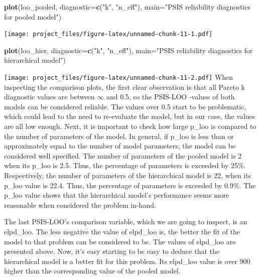 \documentclass[
]{article}
\newenvironment{Shaded}{\begin{snugshade}}{\end{snugshade}}
\newcommand{\DataTypeTok}[1]{\textcolor[rgb]{0.13,0.29,0.53}{#1}}
\newcommand{\KeywordTok}[1]{\textcolor[rgb]{0.13,0.29,0.53}{\textbf{#1}}}
\newcommand{\NormalTok}[1]{#1}
\newcommand{\StringTok}[1]{\textcolor[rgb]{0.31,0.60,0.02}{#1}}
\begin{document}
\begin{Shaded}
\begin{Highlighting}[]
\KeywordTok{plot}\NormalTok{(loo\_pooled,}
\DataTypeTok{diagnostic=}\KeywordTok{c}\NormalTok{(}\StringTok{"k"}\NormalTok{, }\StringTok{"n\_eff"}\NormalTok{),}
\DataTypeTok{main=}\StringTok{"PSIS reliability diagnostics for pooled model"}\NormalTok{)}
\end{Highlighting}
\end{Shaded}

\texttt{[image: project\_files/figure-latex/unnamed-chunk-11-1.pdf]}

\begin{Shaded}
\begin{Highlighting}[]
\KeywordTok{plot}\NormalTok{(loo\_hier,}
\DataTypeTok{diagnostic=}\KeywordTok{c}\NormalTok{(}\StringTok{"k"}\NormalTok{, }\StringTok{"n\_eff"}\NormalTok{),}
\DataTypeTok{main=}\StringTok{"PSIS reliability diagnostics for hierarchical model"}\NormalTok{)}
\end{Highlighting}
\end{Shaded}

\texttt{[image: project\_files/figure-latex/unnamed-chunk-11-2.pdf]} When
inspecting the comparison plots, the first clear observation is that all
Pareto k diagnostic values are between \(\infty\) and 0.5, so the
PSIS-LOO -values of both models can be considered reliable. The values
over 0.5 start to be problematic, which could lead to the need to
re-evaluate the model, but in our case, the values are all low enough.
Next, it is important to check how large p\_loo is compared to the
number of parameters of the model. In general, if p\_loo is less than or
approximately equal to the number of model parameters, the model can be
considered well specified. The number of parameters of the pooled model
is 2 when its p\_loo is 2.5. Thus, the percentage of parameters is
exceeded by 25\%. Respectively, the number of parameters of the
hierarchical model is 22, when its p\_loo value is 22.4. Thus, the
percentage of parameters is exceeded by 0.9\%. The p\_loo value shows
that the hierarchical model's performance seems more reasonable when
considered the problem in-hand.

The last PSIS-LOO's comparison variable, which we are going to inspect,
is an elpd\_loo. The less negative the value of elpd\_loo is, the better
the fit of the model to that problem can be considered to be. The values
of elpd\_loo are presented above. Now, it's easy starting to be easy to
deduce that the hierarchical model is a better fit for this problem. Its
elpd\_loo value is over 900 higher than the corresponding value of the
pooled model.
\end{document}

